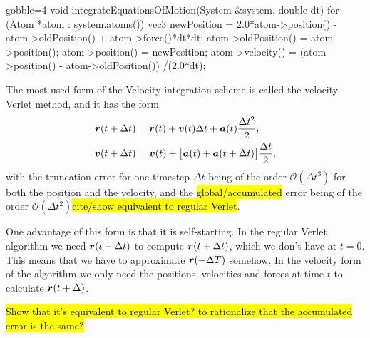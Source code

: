 \begin{listing}[!htb]
\begin{cppcode*}{gobble=4}
    void integrateEquationsOfMotion(System &system, double dt)
    {
        for (Atom *atom : system.atoms())
        {
            vec3 newPosition = 2.0*atom->position() - atom->oldPosition() 
                               + atom->force()*dt*dt;
            atom->oldPosition() = atom->position();
            atom->position() = newPosition;
            atom->velocity() = (atom->position() - atom->oldPosition())
                               /(2.0*dt);
        }
    }
\end{cppcode*}
\caption{
    Caption.
    \label{list:regular_verlet}
}
\end{listing}

The most used form of the Velocity integration scheme is called the velocity Verlet method\cite{swope1982computer}, and it has the form
\begin{align}
    \boldsymbol{r}(t + \Delta t) &= \boldsymbol{r}(t) + \boldsymbol{v}(t)\Delta t + \boldsymbol{a}(t)\frac{\Delta t^2}{2}, \label{eq:velocity_verlet_position}\\
    \boldsymbol{v}(t + \Delta t) &= \boldsymbol{v}(t) + \big[\boldsymbol{a}(t) + \boldsymbol{a}(t + \Delta t)\big] \frac{\Delta t}{2}, \label{eq:velocity_verlet_velocity}
\end{align}
with the truncation error for one timestep $\Delta t$ being of the order $\mathcal{O}(\Delta t^3)$ for both the position and the velocity, and the \hl{global/accumulated} error being of the order $\mathcal{O}(\Delta t^2)$\hl{cite/show equivalent to regular Verlet}. 

One advantage of this form is that it is self-starting. In the regular Verlet algorithm we need $\boldsymbol{r}(t-\Delta t)$ to compute $\boldsymbol{r}(t+\Delta t)$, which we don't have at $t = 0$. This means that we have to approximate $\boldsymbol{r}(-\Delta T)$ somehow. In the velocity form of the algorithm we only need the positions, velocities and forces at time $t$ to calculate $\boldsymbol{r}(t+\Delta)$.

\hl{Show that it's equivalent to regular Verlet? to rationalize that the accumulated error is the same?}

